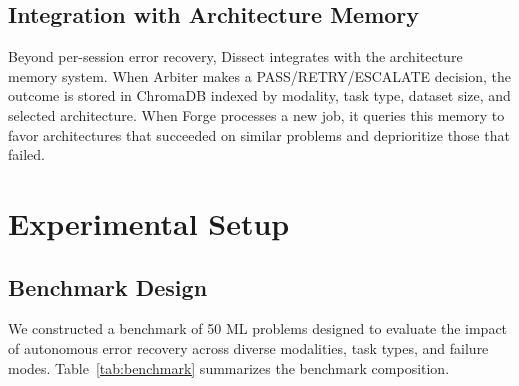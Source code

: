 \documentclass[conference]{IEEEtran}
\begin{document}
\subsection{Integration with Architecture Memory}

Beyond per-session error recovery, Dissect integrates with the architecture memory
system. When Arbiter makes a PASS/RETRY/ESCALATE decision, the outcome is stored in
ChromaDB indexed by modality, task type, dataset size, and selected architecture. When
Forge processes a new job, it queries this memory to favor architectures that succeeded on
similar problems and deprioritize those that failed.

\section{Experimental Setup}
\label{sec:experimental}

\subsection{Benchmark Design}

We constructed a benchmark of 50 ML problems designed to evaluate the impact of autonomous
error recovery across diverse modalities, task types, and failure modes. Table~\ref{tab:benchmark}
summarizes the benchmark composition.
\end{document}
